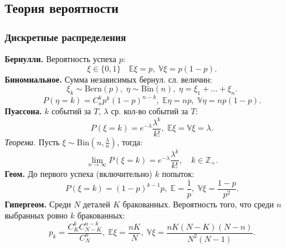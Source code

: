 \subsection{Теория вероятности}
\subsubsection{Дискретные распределения}
\textbf{Бернулли.} Вероятность успеха $p$:
$$\xi\in\{0,1\}\quad \mathbb{E}\xi=p,\;\mathbb{V}\xi=p(1-p).$$
\textbf{Биномиальное.} Сумма независимых бернул. сл. величин:
$$\xi_k\sim\text{Bern}(p),\;\eta\sim\text{Bin}(n),\;\eta=\xi_1+\dots+\xi_n.$$
$$P(\eta=k)=C_n^kp^k(1-p)^{n-k},\;\mathbb{E}\eta=np,\;\mathbb{V}\eta=np(1-p).$$
\textbf{Пуассона.} $k$ событий за $T$, $\lambda$ ср. кол-во событий за $T$:
$$P(\xi=k)=e^{-\lambda}\dfrac{\lambda^k}{k!},\;\mathbb{E}\xi=\mathbb{V}\xi=\lambda.$$
\textit{Теорема.} Пусть $\xi\sim\text{Bin}(n,\frac{\lambda}{n})$, тогда:
$$\displaystyle\lim_{n\to\infty}P(\xi=k)=e^{-\lambda}\dfrac{\lambda^k}{k!},\quad k\in\mathbb{Z}_+.$$
\textbf{Геом.} До первого успеха (включительно) $k$ попыток:
$$P(\xi=k)=(1-p)^{k-1}p,\;\mathbb{E}=\dfrac{1}{p},\;\mathbb{V}\xi=\dfrac{1-p}{p^2}.$$
\textbf{Гипергеом.} Среди $N$ деталей $K$ бракованных. Вероятность того, что среди $n$ выбранных ровно $k$ бракованных:
$$p_k=\dfrac{C_K^kC_{N-K}^{n-k}}{C_N^n},\;\mathbb{E}\xi=\dfrac{nK}{N},\;\mathbb{V}\xi=\dfrac{nK(N-K)(N-n)}{N^2(N-1)}.$$